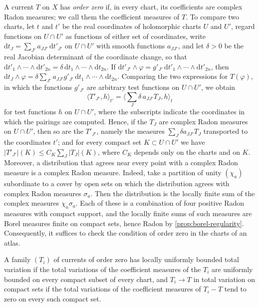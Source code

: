 A current $T$ on $X$ has \emph{order zero} if, in every chart, its coefficients are complex Radon measures; we call them the coefficient measures of $T$. To compare two charts, let $t$ and $t'$ be the real coordinates of holomorphic charts $U$ and $U'$, regard functions on $U\cap U'$ as functions of either set of coordinates, write $\mathrm dt_J=\sum_{J'}a_{JJ'}\,\mathrm dt'_{J'}$ on $U\cap U'$ with smooth functions $a_{JJ'}$, and let $\delta>0$ be the real Jacobian determinant of the coordinate change, so that $\mathrm dt'_1\wedge\cdots\wedge\mathrm dt'_{2n}=\delta\,\mathrm dt_1\wedge\cdots\wedge\mathrm dt_{2n}$. If $\mathrm dt'_{J'}\wedge\varphi=g'_{J'}\,\mathrm dt'_1\wedge\cdots\wedge\mathrm dt'_{2n}$, then $\mathrm dt_J\wedge\varphi=\delta\sum_{J'}a_{JJ'}g'_{J'}\,\mathrm dt_1\wedge\cdots\wedge\mathrm dt_{2n}$. Comparing the two expressions for $T(\varphi)$, in which the functions $g'_{J'}$ are arbitrary test functions on $U\cap U'$, we obtain
\begin{equation}\label{eq:current-coefficient-change}
 \langle T'_{J'},h\rangle_{t'}=\Big\langle\sum_J\delta\,a_{JJ'}T_J,h\Big\rangle_t
\end{equation}
for test functions $h$ on $U\cap U'$, where the subscripts indicate the coordinates in which the pairings are computed. Hence, if the $T_J$ are complex Radon measures on $U\cap U'$, then so are the $T'_{J'}$, namely the measures $\sum_J\delta a_{JJ'}T_J$ transported to the coordinates $t'$; and for every compact set $K\subset U\cap U'$ we have $|T'_{J'}|(K)\leq C_K\sum_J|T_J|(K)$, where $C_K$ depends only on the charts and on $K$. Moreover, a distribution that agrees near every point with a complex Radon measure is a complex Radon measure. Indeed, take a partition of unity $(\chi_a)$ subordinate to a cover by open sets on which the distribution agrees with complex Radon measures $\sigma_a$. Then the distribution is the locally finite sum of the complex measures $\chi_a\sigma_a$. Each of these is a combination of four positive Radon measures with compact support, and the locally finite sums of such measures are Borel measures finite on compact sets, hence Radon by \cref{prop:borel-regularity}. Consequently, it suffices to check the condition of order zero in the charts of an atlas.

A family $(T_i)$ of currents of order zero has locally uniformly bounded total variation if the total variations of the coefficient measures of the $T_i$ are uniformly bounded on every compact subset of every chart, and $T_i\to T$ in total variation on compact sets if the total variations of the coefficient measures of $T_i-T$ tend to zero on every such compact set.

